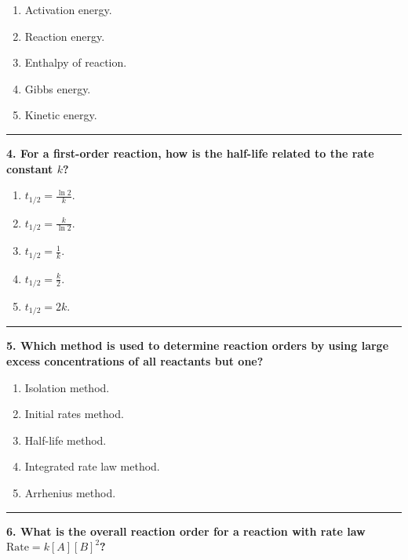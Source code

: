 \documentclass[
  9pt,
]{extbook}
\providecommand{\tightlist}{%
  \setlength{\itemsep}{0pt}\setlength{\parskip}{0pt}}
\theoremstyle{definition}
\theoremstyle{definition}
\theoremstyle{definition}
\theoremstyle{definition}
\theoremstyle{remark}
\begin{document}
\begin{enumerate}
\def\labelenumi{\alph{enumi}.}
\tightlist
\item
  Activation energy.
\item
  Reaction energy.
\item
  Enthalpy of reaction.
\item
  Gibbs energy.
\item
  Kinetic energy.
\end{enumerate}

\begin{center}\rule{0.5\linewidth}{0.5pt}\end{center}

\textbf{4. For a first-order reaction, how is the half-life related to the rate constant \(k\)?}

\begin{enumerate}
\def\labelenumi{\alph{enumi}.}
\tightlist
\item
  \(t_{1/2} = \frac{\ln 2}{k}\).
\item
  \(t_{1/2} = \frac{k}{\ln 2}\).
\item
  \(t_{1/2} = \frac{1}{k}\).
\item
  \(t_{1/2} = \frac{k}{2}\).
\item
  \(t_{1/2} = 2k\).
\end{enumerate}

\begin{center}\rule{0.5\linewidth}{0.5pt}\end{center}

\textbf{5. Which method is used to determine reaction orders by using large excess concentrations of all reactants but one?}

\begin{enumerate}
\def\labelenumi{\alph{enumi}.}
\tightlist
\item
  Isolation method.
\item
  Initial rates method.
\item
  Half-life method.
\item
  Integrated rate law method.
\item
  Arrhenius method.
\end{enumerate}

\begin{center}\rule{0.5\linewidth}{0.5pt}\end{center}

\textbf{6. What is the overall reaction order for a reaction with rate law \(\text{Rate} = k[A][B]^2\)?}
\end{document}
